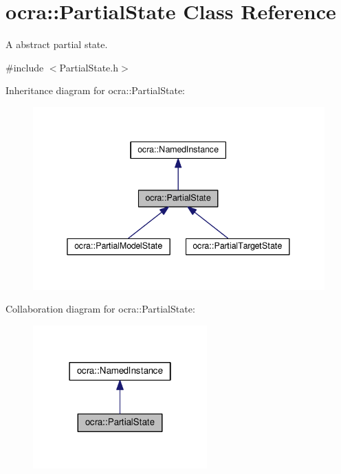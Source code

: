 \hypertarget{classocra_1_1PartialState}{}\section{ocra\+:\+:Partial\+State Class Reference}
\label{classocra_1_1PartialState}


A abstract partial state.  




{\ttfamily \#include $<$Partial\+State.\+h$>$}



Inheritance diagram for ocra\+:\+:Partial\+State\+:
\nopagebreak
\begin{figure}[H]
\begin{center}
\leavevmode
\includegraphics[width=338pt]{da/d2f/classocra_1_1PartialState__inherit__graph}
\end{center}
\end{figure}


Collaboration diagram for ocra\+:\+:Partial\+State\+:
\nopagebreak
\begin{figure}[H]
\begin{center}
\leavevmode
\includegraphics[width=190pt]{d3/d8e/classocra_1_1PartialState__coll__graph}
\end{center}
\end{figure}
